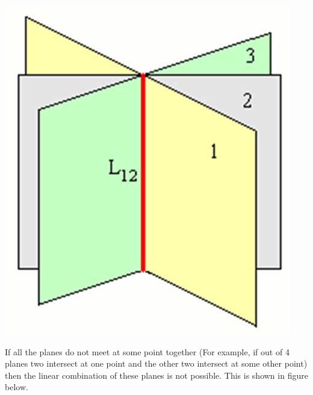 \documentclass[a4paper, 11pt]{article}
\begin{document}
\begin{enumerate}
	 	\begin{center}
  	\includegraphics[width=\linewidth]{images/infinite_solutions_plane.jpg}
	\end{center}
	
	If all the planes do not meet at some point together (For example, if out of 4 planes two intersect at one point and the other two intersect at some other point) then the linear combination of these planes is not possible.  This is shown in figure below. \cite{seven} \cite{eight}
	

\end{enumerate}
\end{document}
